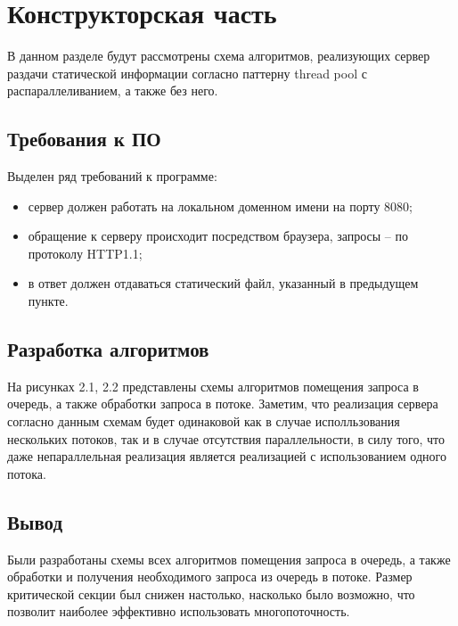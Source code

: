 \chapter{Конструкторская часть}
В данном разделе будут рассмотрены схема алгоритмов, реализующих сервер раздачи статической информации согласно паттерну thread pool с распараллеливанием, а также без него.

\section{Требования к ПО}
Выделен ряд требований к программе:
\begin{itemize}
	\item сервер должен работать на локальном доменном имени на порту 8080;
    \item обращение к серверу происходит посредством браузера, запросы -- по протоколу HTTP1.1;
    \item в ответ должен отдаваться статический файл, указанный в предыдущем пункте.\newline
\end{itemize}

\section{Разработка алгоритмов}
На рисунках 2.1, 2.2 представлены схемы алгоритмов помещения запроса в очередь, а также обработки запроса в потоке.
Заметим, что реализация сервера согласно данным схемам будет одинаковой как в случае исполльзования нескольких потоков, так и в случае отсутствия параллельности, в силу того, что даже непараллельная реализация является реализацией с использованием одного потока.

\clearpage

\section*{Вывод}

Были разработаны схемы всех алгоритмов помещения запроса в очередь, а также обработки и получения необходимого запроса из очередь в потоке. Размер критической секции был снижен настолько, насколько было возможно, что позволит наиболее эффективно использовать многопоточность.
